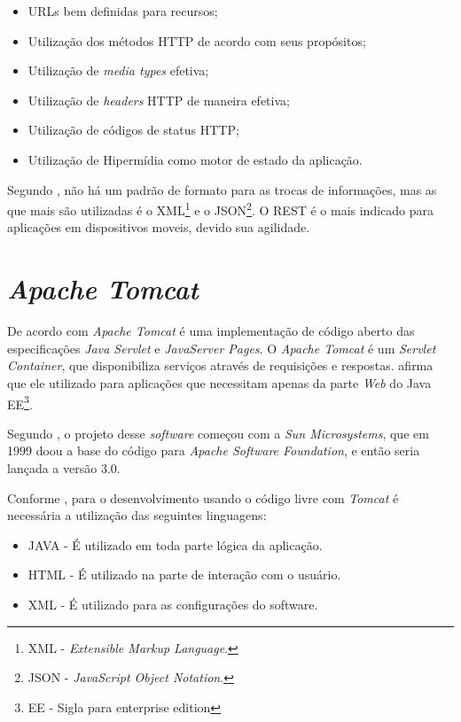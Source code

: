 	\begin{itemize}
	  \item URLs bem definidas para recursos;
	  \item Utilização dos métodos HTTP de acordo com seus propósitos;
	  \item Utilização de \textit{media types} efetiva;
	  \item Utilização de \textit{headers} HTTP de maneira efetiva;
	  \item Utilização de códigos de status HTTP;
	  \item Utilização de Hipermídia como motor de estado da aplicação.
	\end{itemize}
	 
	\par Segundo , não há um padrão de formato para as
 trocas de informações, mas as que mais são utilizadas é o XML\footnote{XML
 - \textit{Extensible Markup Language}.} e o JSON\footnote{JSON - 
 \textit{JavaScript Object Notation}.}. O REST é o mais indicado para aplicações
 em dispositivos moveis, devido sua agilidade.
	
	
\section{\textit{Apache Tomcat}}

	\par De acordo com  \textit{Apache Tomcat} é uma
implementação de código aberto das especificações \textit{Java Servlet} e
\textit{JavaServer Pages}. O \textit{Apache Tomcat} é um \textit{Servlet
Container}, que disponibiliza serviços através de requisições e respostas.
 afirma que ele utilizado para aplicações que necessitam
apenas da parte \textit{Web} do Java EE\footnote{EE - Sigla para enterprise
edition}.

	\par Segundo , o projeto desse \textit{software}
começou com a \textit{Sun Microsystems}, que em 1999 doou a base do código para
\textit{Apache Software Foundation}, e então seria lançada a versão 3.0.

	\par Conforme , para o desenvolvimento usando o código
livre com \textit{Tomcat} é necessária a utilização das seguintes linguagens:
	\begin{itemize}
	  
	  \item JAVA - É utilizado em toda parte lógica da aplicação.
	  
	  \item HTML - É utilizado na parte de interação com o usuário.
	  
	  \item XML - É utilizado para as configurações do software. 
	
	\end{itemize}
 

